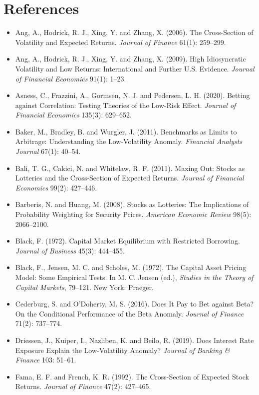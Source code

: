 \section*{References}

\begin{itemize}
  \item Ang, A., Hodrick, R. J., Xing, Y. and Zhang, X. (2006). The Cross-Section of Volatility and Expected Returns. \emph{Journal of Finance} 61(1): 259--299.
  \item Ang, A., Hodrick, R. J., Xing, Y. and Zhang, X. (2009). High Idiosyncratic Volatility and Low Returns: International and Further U.S. Evidence. \emph{Journal of Financial Economics} 91(1): 1--23.
  \item Asness, C., Frazzini, A., Gormsen, N. J. and Pedersen, L. H. (2020). Betting against Correlation: Testing Theories of the Low-Risk Effect. \emph{Journal of Financial Economics} 135(3): 629--652.
  \item Baker, M., Bradley, B. and Wurgler, J. (2011). Benchmarks as Limits to Arbitrage: Understanding the Low-Volatility Anomaly. \emph{Financial Analysts Journal} 67(1): 40--54.
  \item Bali, T. G., Cakici, N. and Whitelaw, R. F. (2011). Maxing Out: Stocks as Lotteries and the Cross-Section of Expected Returns. \emph{Journal of Financial Economics} 99(2): 427--446.
  \item Barberis, N. and Huang, M. (2008). Stocks as Lotteries: The Implications of Probability Weighting for Security Prices. \emph{American Economic Review} 98(5): 2066--2100.
  \item Black, F. (1972). Capital Market Equilibrium with Restricted Borrowing. \emph{Journal of Business} 45(3): 444--455.
  \item Black, F., Jensen, M. C. and Scholes, M. (1972). The Capital Asset Pricing Model: Some Empirical Tests. In M. C. Jensen (ed.), \emph{Studies in the Theory of Capital Markets}, 79--121. New York: Praeger.
  \item Cederburg, S. and O'Doherty, M. S. (2016). Does It Pay to Bet against Beta? On the Conditional Performance of the Beta Anomaly. \emph{Journal of Finance} 71(2): 737--774.
  \item Driessen, J., Kuiper, I., Nazliben, K. and Beilo, R. (2019). Does Interest Rate Exposure Explain the Low-Volatility Anomaly? \emph{Journal of Banking \& Finance} 103: 51--61.
  \item Fama, E. F. and French, K. R. (1992). The Cross-Section of Expected Stock Returns. \emph{Journal of Finance} 47(2): 427--465.

\end{itemize}
